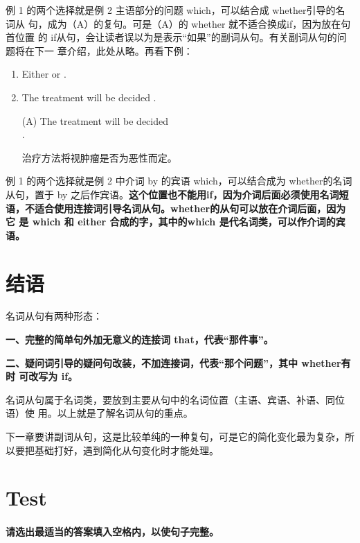例 1 的两个选择就是例 2 主语部分的问题 which，可以结合成 whether引导的名词从
句，成为（A）的复句。可是（A）的 whether 就不适合换成if，因为放在句首位置
的 if从句，会让读者误以为是表示“如果”的副词从句。有关副词从句的问题将在下一
章介绍，此处从略。再看下例：

\begin{enumerate}
\item   Either  or .
\item   The treatment will be decided  .

\reitem (A) The treatment will be decided  \\ .

治疗方法将视肿瘤是否为恶性而定。
\end{enumerate}

例 1 的两个选择就是例 2 中介词 by 的宾语 which，可以结合成为 whether的名词
从句，置于 by 之后作宾语。\textbf{这个位置也不能用if，因为介词后面必须使用名词短
  语，不适合使用连接词引导名词从句。whether的从句可以放在介词后面，因为它
  是 which 和 either 合成的字，其中的which 是代名词类，可以作介词的宾语。}

\section{结语}

名词从句有两种形态：

\textbf{一、完整的简单句外加无意义的连接词 that，代表“那件事”。}

\textbf{二、疑问词引导的疑问句改装，不加连接词，代表“那个问题”，其中 whether有时
  可改写为 if。}

名词从句属于名词类，要放到主要从句中的名词位置（主语、宾语、补语、同位语）使
用。以上就是了解名词从句的重点。

下一章要讲副词从句，这是比较单纯的一种复句，可是它的简化变化最为复杂，所以要把基础打好，遇到简化从句变化时才能处理。

\section{Test}

\paragraph{请选出最适当的答案填入空格内，以使句子完整。}


